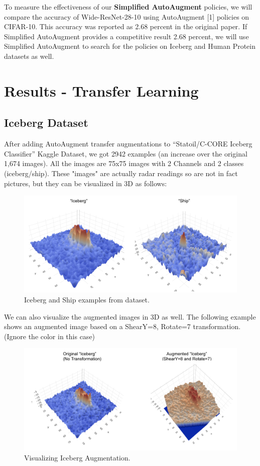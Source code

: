 \documentclass[10pt,twocolumn,letterpaper]{article}
\begin{document}
To measure the effectiveness of our \textbf{Simplified AutoAugment} policies, we will compare the accuracy of Wide-ResNet-28-10 using AutoAugment [1] policies on CIFAR-10.  This accuracy was reported as 2.68 percent in the original paper.  If Simplified AutoAugment provides a competitive result 2.68 percent, we will use Simplified AutoAugment to search for the policies on Iceberg and Human Protein datasets as well.



\section{Results - Transfer Learning}

\subsection{Iceberg Dataset}

After adding AutoAugment transfer augmentations to “Statoil/C-CORE Iceberg Classifier” Kaggle Dataset, we got 2942 examples (an increase over the original 1,674 images). All the images are 75x75 images with 2 Channels and 2 classes (iceberg/ship).  These "images" are actually radar readings so are not in fact pictures,  but they can be visualized in 3D as follows:

\begin{figure}[bhp]
\includegraphics[width=\columnwidth]{iceberg_ship_example.png}
\caption{Iceberg and Ship examples from dataset.}
\end{figure}

We can also visualize the augmented images in 3D as well.  The following example shows an augmented image based on a ShearY=8, Rotate=7 transformation.  (Ignore the color in this case) 

\begin{figure}[bhp]
\includegraphics[width=\columnwidth]{iceberg_aug_example.png}
\caption{Visualizing Iceberg Augmentation.}
\end{figure}
\end{document}
